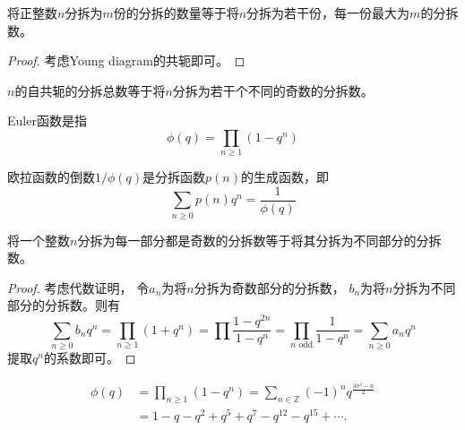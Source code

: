 \begin{proposition}
	将正整数$n$分拆为$m$份的分拆的数量等于将$n$分拆为若干份，每一份最大为$m$的分拆数。
\end{proposition}
\begin{proof}
	考虑Young diagram的共轭即可。
\end{proof}
\begin{proposition}
	$n$的自共轭的分拆总数等于将$n$分拆为若干个不同的奇数的分拆数。
\end{proposition}
\begin{definition}
	Euler函数是指
	\begin{equation*}
		\phi(q) = \prod\limits_{n\geq 1}(1-q^n)
	\end{equation*}
\end{definition}
\begin{corollary}
	欧拉函数的倒数$1/ \phi(q)$是分拆函数$p(n)$的生成函数，即
	\begin{equation*}
		\sum\limits_{n\geq 0}p(n)q^n = \frac{1}{\phi(q)}
	\end{equation*}
\end{corollary}
\begin{theorem}
	将一个整数$n$分拆为每一部分都是奇数的分拆数等于将其分拆为不同部分的分拆数。
\end{theorem}
\begin{proof}
	考虑代数证明， 令$a_n$为将$n$分拆为奇数部分的分拆数， $b_n$为将$n$分拆为不同部分的分拆数。则有
	\begin{equation*}
		\sum\limits_{n\geq 0} b_nq^n = \prod\limits_{n\geq 1}(1+q^n) = \prod \frac{1-q^{2n}}{1-q^n} = \prod\limits_{n\text{ odd}}\frac{1}{1-q^n} = \sum\limits_{n\geq 0}a_n q^n
	\end{equation*}
	提取$q^n$的系数即可。
\end{proof}
\begin{theorem}
	\begin{equation*}
		\begin{split}
			\phi(q)& = \prod\limits_{n\geq 1}(1-q^n) = \sum\limits_{n\in \mathbb{Z}} (-1)^n q^{\frac{3n^2-n}{2}}\\
			& = 1 - q - q^2 + q ^5 +q^7 - q^{12}-q^{15}+\cdots.
		\end{split}
	\end{equation*}
\end{theorem}
